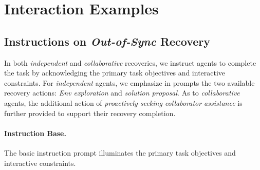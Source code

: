         
        
        
        






\section{Interaction Examples}
\label{Appendix D: Interaction Examples}

\subsection{Instructions on \textit{Out-of-Sync} Recovery}

In both \textit{independent} and \textit{collaborative} recoveries, we instruct agents to complete the task by acknowledging the primary task objectives and interactive constraints.
For \textit{independent} agents, we emphasize in prompts the two available recovery actions: \textcolor{fig2_env}{\textit{Env exploration}} and \textcolor{fig2_code}{\textit{solution proposal}}.
As to \textit{collaborative} agents, the additional action of \textcolor{fig2_ask}{\textit{proactively seeking collaborator assistance}} is further provided to support their recovery completion. 



\paragraph{Instruction Base.} The basic instruction prompt illuminates the primary task objectives and interactive constraints. 

